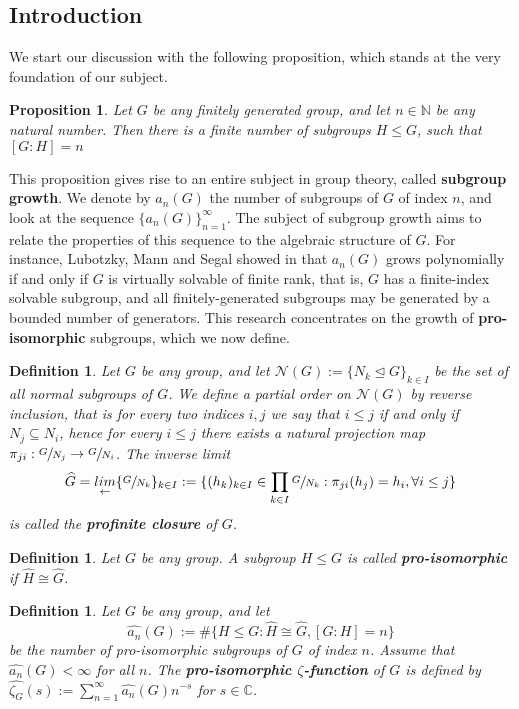 \documentclass[12pt]{article}
\newtheorem{proposition}[theorem]{Proposition}
\newtheorem{definition}[theorem]{Definition}
\begin{document}
\subsection{Introduction}
We start our discussion with the following proposition, which stands at the very foundation of our subject.
\begin{proposition} \label{prop:finite.number.subgroups}
Let $G$ be any finitely generated group, and let $n\in\mathbb{N}$ be any natural number. Then there is a finite number of subgroups $H\leq G$, such that $[G:H]=n$
\end{proposition}
This proposition gives rise to an entire subject in group theory, called \textbf{subgroup growth}. We denote by $a_n(G)$ the number of subgroups of $G$ of index $n$, and look at the sequence $\{a_n(G)\}_{n=1}^{\infty}$. The subject of subgroup growth aims to relate the properties of this sequence to the algebraic structure of $G$. For instance, Lubotzky, Mann and Segal showed in \cite{LubotzkyMannSegal} that $a_n(G)$ grows polynomially if and only if $G$ is virtually solvable of finite rank, that is, $G$ has a finite-index solvable subgroup, and all finitely-generated subgroups may be generated by a bounded number of generators. This research concentrates on the growth of \textbf{pro-isomorphic} subgroups, which we now define.
\begin{definition}
\label{def:profinite.closure}
Let $G$ be any group, and let $\mathcal{N}(G):=\{N_k\trianglelefteq G\}_{k\in I}$ be the set of all normal subgroups of $G$. We define a partial order on $\mathcal{N}(G)$ by reverse inclusion, that is for every two indices $i,j$ we say that $i\leq j$ if and only if $N_j\subseteq N_i$, hence for every $i\leq j$ there exists a natural projection map $\pi_{ji}:\sfrac{G}{N_
j}\rightarrow\sfrac{G}{N_i}$. The inverse limit \[\widehat{G}=\underset{\leftarrow}{lim}\{\sfrac{G}{N_k}\}_{k\in I}:=\{(h_k)_{k\in I}\in\prod_{k\in I}\sfrac{G}{N_k} : \pi_{ji}(h_j)=h_i,\forall i\leq j\}\] is called the \textbf{profinite closure} of $G$.
\end{definition}
\begin{definition}
\label{def:pro.isomorphic}
Let $G$ be any group. A subgroup $H\leq G$ is called \textbf{pro-isomorphic} if $\widehat{H}\cong\widehat{G}$.
\end{definition}
\begin{definition}
\label{def:zeta.pro.isomorphic}
Let $G$ be any group, and let \[\hat{a_n}(G):=\#\{H\leq G : \widehat{H}\cong\widehat{G}, [G:H]=n\}\] be the number of pro-isomorphic subgroups of $G$ of index $n$. Assume that $\hat{a_n}(G)<\infty$ for all $n$. The \textbf{pro-isomorphic $\zeta$-function} of $G$ is defined by $\hat{\zeta_G}(s):=\sum_{n=1}^{\infty}\hat{a_n}(G)n^{-s}$ for $s\in\mathbb{C}$.
\end{definition}
\end{document}
